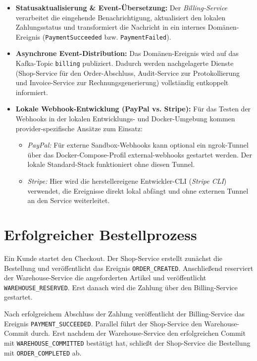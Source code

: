 \documentclass[
  11pt,
  a4paper,
  oneside,
  headings=normal,
  parskip=half,
  DIV=12
]{scrreprt}
\begin{document}
\begin{itemize}
    \item \textbf{Statusaktualisierung \& Event-Übersetzung:} Der \textit{Billing-Service} verarbeitet die eingehende Benachrichtigung, aktualisiert den lokalen Zahlungsstatus und transformiert die Nachricht in ein internes Domänen-Ereignis (\texttt{PaymentSucceeded} bzw. \texttt{PaymentFailed}).
    \item \textbf{Asynchrone Event-Distribution:} Das Domänen-Ereignis wird auf das Kafka-Topic \texttt{billing} publiziert. Dadurch werden nachgelagerte Dienste (Shop-Service für den Order-Abschluss, Audit-Service zur Protokollierung und Invoice-Service zur Rechnungsgenerierung) vollständig entkoppelt informiert.
    \item \textbf{Lokale Webhook-Entwicklung (PayPal vs. Stripe):} Für das Testen der Webhooks in der lokalen Entwicklungs- und Docker-Umgebung kommen provider-spezifische Ansätze zum Einsatz:
    \begin{itemize}
        \item \textit{PayPal:} Für externe Sandbox-Webhooks kann optional ein ngrok-Tunnel über das Docker-Compose-Profil external-webhooks gestartet werden. Der lokale Standard-Stack funktioniert ohne diesen Tunnel.
        \item \textit{Stripe:} Hier wird die herstellereigene Entwickler-CLI (\textit{Stripe CLI}) verwendet, die Ereignisse direkt lokal abfängt und ohne externen Tunnel an den Service weiterleitet.
    \end{itemize}
\end{itemize}



\section{Erfolgreicher Bestellprozess}

Ein Kunde startet den Checkout. Der Shop-Service erstellt zunächst die Bestellung und veröffentlicht das Ereignis \texttt{ORDER\_CREATED}. Anschließend reserviert der Warehouse-Service die angeforderten Artikel und veröffentlicht \texttt{WAREHOUSE\_RESERVED}. Erst danach wird die Zahlung über den Billing-Service gestartet.

Nach erfolgreichem Abschluss der Zahlung veröffentlicht der Billing-Service das Ereignis \texttt{PAYMENT\_SUCCEEDED}. Parallel führt der Shop-Service den Warehouse-Commit durch. Erst nachdem der Warehouse-Service den erfolgreichen Commit mit \texttt{WAREHOUSE\_COMMITTED} bestätigt hat, schließt der Shop-Service die Bestellung mit \texttt{ORDER\_COMPLETED} ab.
\end{document}
